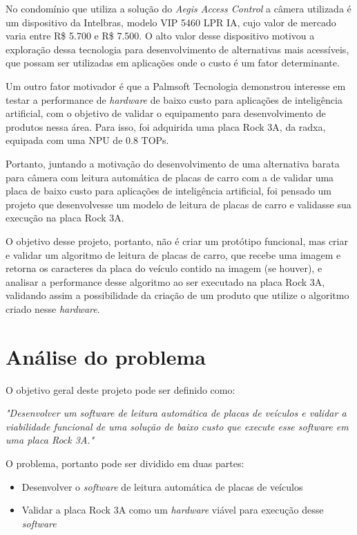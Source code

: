 No condomínio que utiliza a solução do \textit{Aegis Access Control} a câmera utilizada é um dispositivo da Intelbras, modelo VIP 5460 LPR IA, cujo valor de mercado varia entre R\$ 5.700 e R\$ 7.500. O alto valor desse dispositivo motivou a exploração dessa tecnologia para desenvolvimento de alternativas mais acessíveis, que possam ser utilizadas em aplicações onde o custo é um fator determinante.

Um outro fator motivador é que a Palmsoft Tecnologia demonstrou interesse em testar a performance de \textit{hardware} de baixo custo para aplicações de inteligência artificial, com o objetivo de validar o equipamento para desenvolvimento de produtos nessa área. Para isso, foi adquirida uma placa Rock 3A, da radxa, equipada com uma NPU de 0.8 TOPs.

Portanto, juntando a motivação do desenvolvimento de uma alternativa barata para câmera com leitura automática de placas de carro com a de validar uma placa de baixo custo para aplicações de inteligência artificial, foi pensado um projeto que desenvolvesse um modelo de leitura de placas de carro e validasse sua execução na placa Rock 3A.

O objetivo desse projeto, portanto, não é criar um protótipo funcional, mas criar e validar um algoritmo de leitura de placas de carro, que recebe uma imagem e retorna os caracteres da placa do veículo contido na imagem (se houver), e analisar a performance desse algoritmo ao ser executado na placa Rock 3A, validando assim a possibilidade da criação de um produto que utilize o algoritmo criado nesse \textit{hardware}.

\section{Análise do problema}

O objetivo geral deste projeto pode ser definido como:

\begin{center}
    \textit{"Desenvolver um software de leitura automática de placas de veículos e validar a viabilidade funcional de uma solução de baixo custo que execute esse software em uma placa Rock 3A."}
\end{center}

O problema, portanto pode ser dividido em duas partes:

\begin{itemize}
    \item Desenvolver o \textit{software} de leitura automática de placas de veículos
    \item Validar a placa Rock 3A como um \textit{hardware} viável para execução desse \textit{software}
\end{itemize}

